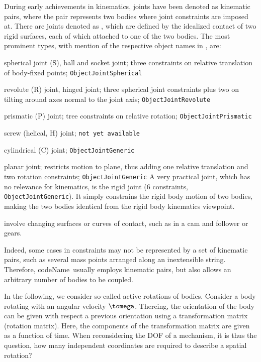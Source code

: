 During early achievements in kinematics, joints have been denoted as kinematic pairs, where the pair represents two bodies where joint constraints are imposed at. There are joints denoted as , which are defined by the idealized contact of two rigid surfaces, each of which attached to one of the two bodies. The most prominent types, with mention of the respective object names in \codeName, are:
\bi
  \item spherical joint (S), ball and socket joint; three constraints on relative translation of body-fixed points; \texttt{ObjectJointSpherical}
  \item revolute (R) joint, hinged joint; three spherical joint constraints plus two on tilting around axes normal to the joint axis; \texttt{ObjectJointRevolute}
  \item prismatic (P) joint; tree constraints on relative rotation; \texttt{ObjectJointPrismatic}
  \item screw (helical, H) joint; \texttt{not yet available}
  \item cylindrical (C) joint; \texttt{ObjectJointGeneric}
  \item planar joint; restricts motion to plane, thus adding one relative translation and two rotation constraints; \texttt{ObjectJointGeneric}
\ei
A very practical joint, which has no relevance for kinematics, is the rigid joint (6 constraints, \texttt{ObjectJointGeneric}). It simply constrains the rigid body motion of two bodies, making the two bodies identical from the rigid body kinematics viewpoint.

 involve changing surfaces or curves of contact, such as in a cam and follower or gears.

Indeed, some cases in constraints may not be represented by a set of kinematic pairs, such as several mass points arranged along an inextensible string. Therefore, codeName\ usually employs kinematic pairs, but also allows an arbitrary number of bodies to be coupled.


In the following, we consider so-called active rotations of bodies. Consider a body rotating with an angular velocity $\tomega$. Thereing, the orientation of the body can be given with respect a previous orientation using a transformation matrix (rotation matrix).
Here, the components of the transformation matrix are given as a function of time. When reconsidering the \ac{DOF} of a mechanism, it is thus the question, how many independent coordinates are required to describe a spatial rotation?

